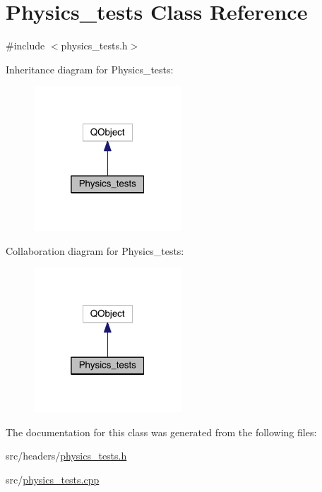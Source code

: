 \hypertarget{class_physics__tests}{\section{Physics\+\_\+tests Class Reference}
\label{class_physics__tests}
}


{\ttfamily \#include $<$physics\+\_\+tests.\+h$>$}



Inheritance diagram for Physics\+\_\+tests\+:\nopagebreak
\begin{figure}[H]
\begin{center}
\leavevmode
\includegraphics[width=157pt]{class_physics__tests__inherit__graph}
\end{center}
\end{figure}


Collaboration diagram for Physics\+\_\+tests\+:\nopagebreak
\begin{figure}[H]
\begin{center}
\leavevmode
\includegraphics[width=157pt]{class_physics__tests__coll__graph}
\end{center}
\end{figure}


The documentation for this class was generated from the following files\+:\begin{DoxyCompactItemize}
\item 
src/headers/\hyperlink{physics__tests_8h}{physics\+\_\+tests.\+h}\item 
src/\hyperlink{physics__tests_8cpp}{physics\+\_\+tests.\+cpp}\end{DoxyCompactItemize}
